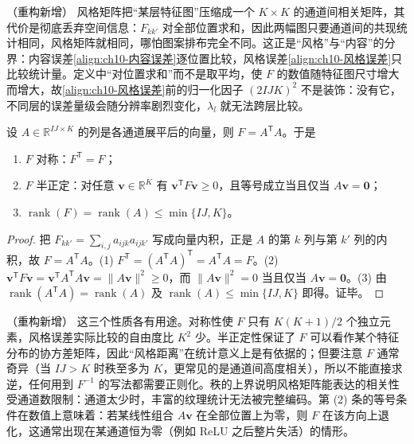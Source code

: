 \documentclass[../../main.tex]{subfiles}
\begin{document}
\begin{remark}（重构新增）
风格矩阵把“某层特征图”压缩成一个 $K\times K$ 的通道间相关矩阵，其代价是彻底丢弃空间信息：$F_{kk'}$ 对全部位置求和，因此两幅图只要通道间的共现统计相同，风格矩阵就相同，哪怕图案排布完全不同。这正是“风格”与“内容”的分界：内容误差\eqref{align:ch10-内容误差}逐位置比较，风格误差\eqref{align:ch10-风格误差}只比较统计量。定义中“对位置求和”而不是取平均，使 $F$ 的数值随特征图尺寸增大而增大，故\eqref{align:ch10-风格误差}前的归一化因子 $(2IJK)^2$ 不是装饰：没有它，不同层的误差量级会随分辨率剧烈变化，$\lambda_l$ 就无法跨层比较。
\end{remark}

\begin{proposition}\label{proposition:ch10-Gram矩阵性质}
设 $A\in\mathbb{R}^{IJ\times K}$ 的列是各通道展平后的向量，则 $F=A^{\mathsf{T}}A$。于是
\begin{enumerate}
  \item $F$ 对称：$F^{\mathsf{T}}=F$；
  \item $F$ 半正定：对任意 $\mathbf{v}\in\mathbb{R}^{K}$ 有 $\mathbf{v}^{\mathsf{T}}F\mathbf{v}\geqslant0$，且等号成立当且仅当 $A\mathbf{v}=\mathbf{0}$；
  \item $\operatorname{rank}(F)=\operatorname{rank}(A)\leqslant\min\{IJ,K\}$。
\end{enumerate}
\end{proposition}
\begin{proof}
把 $F_{kk'}=\sum_{i,j}a_{ijk}a_{ijk'}$ 写成向量内积，正是 $A$ 的第 $k$ 列与第 $k'$ 列的内积，故 $F=A^{\mathsf{T}}A$。(1) $F^{\mathsf{T}}=(A^{\mathsf{T}}A)^{\mathsf{T}}=A^{\mathsf{T}}A=F$。(2) $\mathbf{v}^{\mathsf{T}}F\mathbf{v}=\mathbf{v}^{\mathsf{T}}A^{\mathsf{T}}A\mathbf{v}=\|A\mathbf{v}\|^2\geqslant0$，而 $\|A\mathbf{v}\|^2=0$ 当且仅当 $A\mathbf{v}=\mathbf{0}$。(3) 由 $\operatorname{rank}(A^{\mathsf{T}}A)=\operatorname{rank}(A)$ 及 $\operatorname{rank}(A)\leqslant\min\{IJ,K\}$ 即得。证毕。
\end{proof}

\begin{remark}（重构新增）
这三个性质各有用途。对称性使 $F$ 只有 $K(K+1)/2$ 个独立元素，风格误差实际比较的自由度比 $K^2$ 少。半正定性保证了 $F$ 可以看作某个特征分布的协方差矩阵，因此“风格距离”在统计意义上是有依据的；但要注意 $F$ 通常奇异（当 $IJ>K$ 时秩至多为 $K$，更常见的是通道间高度相关），所以不能直接求逆，任何用到 $F^{-1}$ 的写法都需要正则化。秩的上界说明风格矩阵能表达的相关性受通道数限制：通道太少时，丰富的纹理统计无法被完整编码。第 (2) 条的等号条件在数值上意味着：若某线性组合 $A\mathbf{v}$ 在全部位置上为零，则 $F$ 在该方向上退化，这通常出现在某通道恒为零（例如 ReLU 之后整片失活）的情形。
\end{remark}
\end{document}
